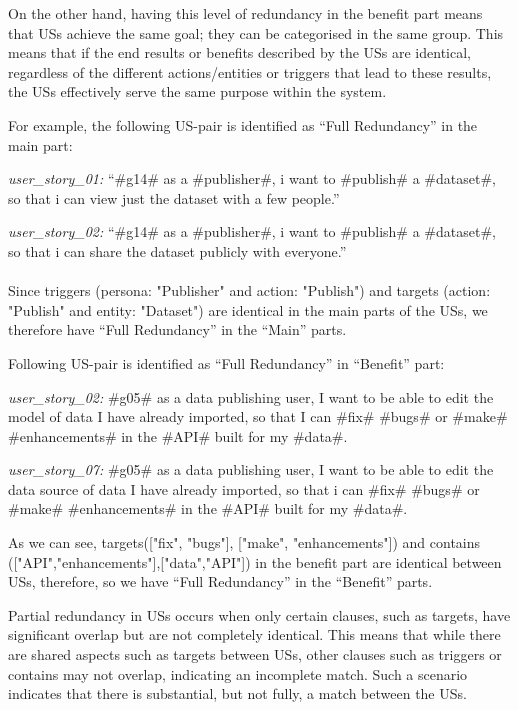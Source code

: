 On the other hand, having this level of redundancy in the benefit part means that USs achieve the same goal; they can be categorised in the same group. This means that if the end results or benefits described by the USs are identical, regardless of the different actions/entities or triggers that lead to these results, the USs effectively serve the same purpose within the system.
\begin{example}
	For example, the following US-pair is identified as \enquote{Full Redundancy} in the main part:
	
	\textit{user\_story\_01:} \enquote{\#g14\# as a \#publisher\#, i want to \#publish\# a \#dataset\#, so that i can view just the dataset with a few people.}
	
	\textit{user\_story\_02:} \enquote{\#g14\# as a \#publisher\#, i want to \#publish\# a \#dataset\#, so that i can share the dataset publicly with everyone.}\\\\
	Since triggers (persona: "Publisher" and action: "Publish") and targets (action: "Publish" and entity: "Dataset") are identical in the main parts of the USs, we therefore have \enquote{Full Redundancy} in the \enquote{Main} parts.
\end{example}
\begin{example}
	Following US-pair is identified as \enquote{Full Redundancy} in \enquote{Benefit} part:
	
	\textit{user\_story\_02:} \#g05\# as a data publishing user, I want to be able to edit the model of data I have already imported, so that I can \#fix\# \#bugs\# or \#make\# \#enhancements\# in the \#API\# built for my \#data\#.
	
	\textit{user\_story\_07:} \#g05\# as a data publishing user, I want to be able to edit the data source of data I have already imported, so that i can \#fix\# \#bugs\# or \#make\# \#enhancements\# in the \#API\# built for my \#data\#.
	
	As we can see, targets(["fix", "bugs"], ["make", "enhancements"]) and contains (["API","enhancements"],["data","API"]) in the benefit part are identical between USs, therefore, so we have \enquote{Full Redundancy} in the \enquote{Benefit} parts.
\end{example}
\begin{definition}
	Partial redundancy in USs occurs when only certain clauses, such as targets, have significant overlap but are not completely identical. This means that while there are shared aspects such as targets between USs, other clauses such as triggers or contains may not overlap, indicating an incomplete match. Such a scenario indicates that there is substantial, but not fully, a match between the USs.
\end{definition}

